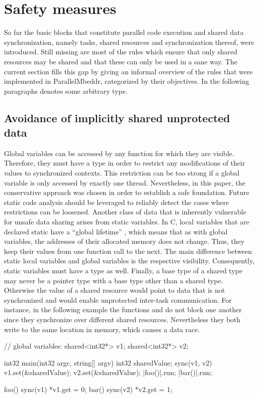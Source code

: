 \section{Safety measures}
\label{safetyMeasures}
So far the basic blocks that constitute parallel code execution and shared data synchronization, namely tasks, shared resources and synchronization thereof, were introduced. Still missing are most of the rules which ensure that only shared resources may be shared and that these can only be used in a sane way. The current section fills this gap by giving an informal overview of the rules that were implemented in ParallelMbeddr, categorized by their objectives. In the following paragraphs  denotes some arbitrary type.

\subsection{Avoidance of implicitly shared unprotected data}
Global variables can be accessed by any function for which they are visible. Therefore, they must have a type  in order to restrict any modifications of their values to synchronized contexts. This restriction can be too strong if a global variable is only accessed by exactly one thread. Nevertheless, in this paper, the conservative approach was chosen in order to establish a safe foundation. Future static code analysis should be leveraged to reliably detect the cases where restrictions can be loosened.
Another class of data that is inherently vulnerable for unsafe data sharing arises from static variables. In C, local variables that are declared static have a ``global lifetime'' \cite[p.~439]{ProgrammingInC}, which means that as with global variables, the addresses of their allocated memory does not change. Thus, they keep their values from one function call to the next. The main difference between static local variables and global variables is the respective visibility. Consequently, static variables must have a type  as well.
Finally, a base type  of a shared type may never be a pointer type with a base type other than a shared type. Otherwise the value of a shared resource would point to data that is not synchronized and would enable unprotected inter-task communication. For instance, in the following example the functions  and  do not block one another since they synchronize over different shared resources. Nevertheless they both write to the same location in memory, which causes a data race.
\begin{ccode}
// global variables:
shared<int32*> v1;
shared<int32*> v2;

int32 main(int32 argc, string[] argv) {
  int32 sharedValue;
  sync(v1, v2) {
    v1.set(&sharedValue);
    v2.set(&sharedValue);
  }
  |foo()|.run;
  |bar()|.run;
}

foo() {
  sync(v1) { *v1.get = 0; }
}
bar() {
  sync(v2) { *v2.get = 1; }
}
\end{ccode}

